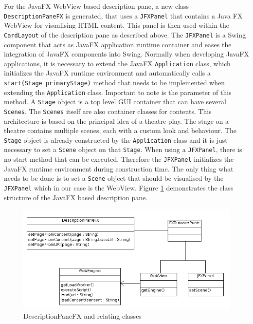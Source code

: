 For the JavaFX WebView based description pane, a new class \texttt{DescriptionPaneFX} is generated, that uses a \texttt{JFXPanel} that contains a Java FX WebView for visualising HTML content.
This panel is then used within the \texttt{CardLayout} of the description pane as described above.
The \texttt{JFXPanel} is a Swing component that acts as JavaFX application runtime container and eases the integration of JavaFX components into Swing.
Normally when developing JavaFX applications, it is necessary to extend the JavaFX \texttt{Application} class, which initializes the JavaFX runtime environment and automatically calls a \texttt{start(Stage primaryStage)} method that needs to be implemented when extending the \texttt{Application} class.
Important to note is the parameter of this method.
A \texttt{Stage} object is a top level GUI container that can have several \texttt{Scenes}.
The \texttt{Scenes} itself are also container classes for contents.
This architecture is based on the principal idea of a theatre play.
The stage on a theatre contains multiple scenes, each with a custom look and behaviour.
The \texttt{Stage} object is already constructed by the \texttt{Application} class and it is just necessary to set a \texttt{Scene} object on that \texttt{Stage}.
When using a \texttt{JFXPanel}, there is no start method that can be executed.
Therefore the \texttt{JFXPanel} initializes the JavaFX runtime environment during construction time.
The only thing what needs to be done is to set a \texttt{Scene} object that should be visualised by the \texttt{JFXPanel} which in our case is the WebView.
Figure \ref{fig:class_diag_desc_pane_fx} demonstrates the class structure of the JavaFX based description pane.

\begin{figure}
	\centering	\includegraphics[width=1.0\textwidth]{./img/classDiagramms/desc_pane_fx.png}
	\caption{DescriptionPaneFX and relating classes}
	\label{fig:class_diag_desc_pane_fx}
\end{figure}

